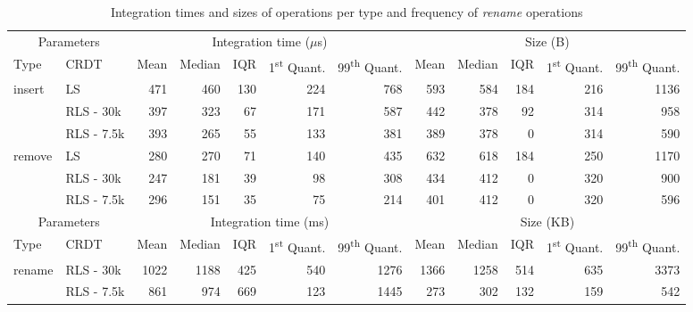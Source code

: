 \documentclass[10pt,journal,compsoc]{IEEEtran}
\let\MYoriglatexcaption\caption
\renewcommand{\caption}[2][\relax]{\MYoriglatexcaption[#2]{#2}}
\newcommand{\trm}[1]{\mathit{#1}}
\begin{document}
\begin{table}[!ht]
    \centering
    \label{tab:impact-frequency}
    \begin{tabular}{llrrrrrrrrrr}
        \toprule
        \multicolumn{2}{c}{Parameters} & \multicolumn{5}{c}{Integration time ($\trm{\mu}$s)}  & \multicolumn{5}{c}{Size (B)} \\
        \cmidrule(lr){1-2} \cmidrule(lr){3-7} \cmidrule(lr){8-12}
        Type & CRDT & Mean & Median &  IQR & 1\textsuperscript{st} Quant. & 99\textsuperscript{th} Quant. & Mean & Median &  IQR & 1\textsuperscript{st} Quant. & 99\textsuperscript{th} Quant. \\
        \midrule
        insert & LS &   471 &    460 &  130 &        224 &         768 &    593 &    584 &  184 &        216 &        1136 \\
            & RLS - 30k &   397 &    323 &   67 &        171 &         587 &    442 &    378 &   92 &        314 &         958 \\
            & RLS - 7.5k &   393 &    265 &   55 &        133 &         381 &    389 &    378 &    0 &        314 &         590 \\
        remove & LS &   280 &    270 &   71 &        140 &         435 &    632 &    618 &  184 &        250 &        1170 \\
            & RLS - 30k &   247 &    181 &   39 &         98 &         308 &    434 &    412 &    0 &        320 &         900 \\
            & RLS - 7.5k &   296 &    151 &   35 &         75 &         214 &    401 &    412 &    0 &        320 &         596 \\
        \midrule
        \multicolumn{2}{c}{Parameters} & \multicolumn{5}{c}{Integration time (ms)}  & \multicolumn{5}{c}{Size (KB)} \\
        \cmidrule(lr){1-2} \cmidrule(lr){3-7} \cmidrule(lr){8-12}
        Type & CRDT & Mean & Median &  IQR & 1\textsuperscript{st} Quant. & 99\textsuperscript{th} Quant. & Mean & Median &  IQR & 1\textsuperscript{st} Quant. & 99\textsuperscript{th} Quant. \\
        \midrule
        rename & RLS - 30k &  1022 &   1188 &  425 &        540 &        1276 &   1366 &   1258 &  514 &        635 &        3373 \\
            & RLS - 7.5k &   861 &    974 &  669 &        123 &        1445 &    273 &    302 &  132 &        159 &         542 \\
        \bottomrule
    \end{tabular}
    \caption{Integration times and sizes of operations per type and frequency of \emph{rename} operations}
\end{table}
\end{document}
